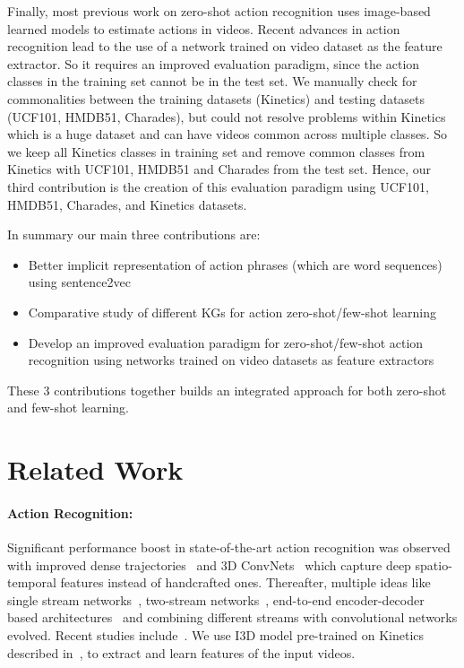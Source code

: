 Finally, most previous work on zero-shot action recognition uses image-based learned models to estimate actions in videos. Recent advances in action recognition lead to the use of a network trained on video dataset as the feature extractor. So it requires an improved evaluation paradigm, since the action classes in the training set cannot be in the test set. We manually check for commonalities between the training datasets (Kinetics) and testing datasets (UCF101, HMDB51, Charades), but could not resolve problems within Kinetics which is a huge dataset and can have videos common across multiple classes. So we keep all Kinetics classes in training set and remove common classes from Kinetics with UCF101, HMDB51 and Charades from the test set. Hence, our third contribution is the creation of this evaluation paradigm using UCF101, HMDB51, Charades, and Kinetics datasets.

In summary our main three contributions are:
\begin{itemize}
    \item Better implicit representation of action phrases (which are word sequences) using sentence2vec
    \item Comparative study of different KGs for action zero-shot/few-shot learning
    \item Develop an improved evaluation paradigm for zero-shot/few-shot action recognition using networks trained on video datasets as feature extractors
\end{itemize}
These 3 contributions together builds an integrated approach for both zero-shot and few-shot learning. \section{Related Work}
\label{rw}

\paragraph{\bf Action Recognition:}
Significant performance boost in state-of-the-art action recognition was observed with improved dense trajectories~\cite{wang2013action} and 3D ConvNets~\cite{ji20133d} which capture deep spatio-temporal features instead of handcrafted ones. Thereafter, multiple ideas like single stream networks~\cite{karpathy2014large}, two-stream networks~\cite{simonyan2014two}, end-to-end encoder-decoder based architectures~\cite{donahue2015long,tran2015learning,yao2015describing} and combining different streams with convolutional networks \cite{feichtenhofer2016convolutional,wang2016temporal} evolved. Recent studies include~\cite{carreira2017quo,diba2017temporal,qiu2017learning,tran2018closer,wang2016temporal,xiang2018s3d,zhang2017deep}. We use I3D model pre-trained on Kinetics described in~\cite{carreira2017quo}, to extract and learn features of the input videos.

